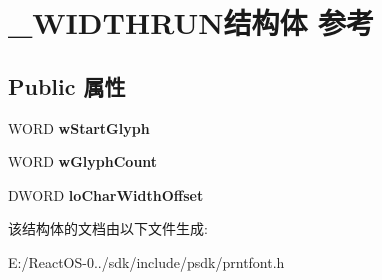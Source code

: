 \hypertarget{struct___w_i_d_t_h_r_u_n}{}\section{\+\_\+\+W\+I\+D\+T\+H\+R\+U\+N结构体 参考}
\label{struct___w_i_d_t_h_r_u_n}
\subsection*{Public 属性}
\begin{DoxyCompactItemize}
\item 
\mbox{\label{struct___w_i_d_t_h_r_u_n_abde0ca43e810f763a8f7b62f297e77b1}} 
W\+O\+RD {\bfseries w\+Start\+Glyph}
\item 
\mbox{\label{struct___w_i_d_t_h_r_u_n_a084d505990af6147e979086b32fd8b13}} 
W\+O\+RD {\bfseries w\+Glyph\+Count}
\item 
\mbox{\label{struct___w_i_d_t_h_r_u_n_a8972cc31a5f05420db9cf07038612cce}} 
D\+W\+O\+RD {\bfseries lo\+Char\+Width\+Offset}
\end{DoxyCompactItemize}


该结构体的文档由以下文件生成\+:\begin{DoxyCompactItemize}
\item 
E\+:/\+React\+O\+S-\/0../sdk/include/psdk/prntfont.\+h\end{DoxyCompactItemize}
